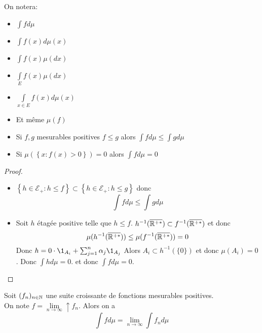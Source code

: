\begin{remarque}
	On notera:
	\begin{itemize}
		\item $\int f d\mu$
		\item $\int f(x) d\mu(x)$
		\item $\int f(x) \mu(dx)$
		\item $\int\limits_E f(x) \mu(dx)$
		\item $\int\limits_{x\in E} f(x) d\mu(x)$
		\item Et même $\mu(f)$
	\end{itemize}
\end{remarque}


\begin{prop}
	\begin{itemize}
		\item Si $f,g$ mesurables positives $f \leq g$ alors $\int f d\mu \leq \int g d\mu$
		\item Si $\mu(\left\{x : f(x) > 0\right\}) = 0$ alors $\int f d\mu = 0$
	\end{itemize}
\end{prop}

\begin{proof}
	\begin{itemize}
		\item $\left\{ h \in \mathcal{E}_+ : h \leq f \right\} \subset \left\{ h \in \mathcal{E}_+ : h \leq g \right\}$ donc
		      $$ \int f d\mu \leq \int g d\mu $$
		\item Soit $h$ étagée positive telle que $h \leq f$.
		      $h^{-1}(\overline{\mathbb{R}^{+*}}) \subset f^{-1}(\overline{\mathbb{R}^{+*}})$ et donc
		      $$ \mu(h^{-1}(\overline{\mathbb{R}^{+*}})) \leq \mu(f^{-1}(\overline{\mathbb{R}^{+*}})) = 0 $$
		      Donc $h = 0 \cdot \1_{A_i} + \sum_{j=1}^n \alpha_j \1_{A_j}$
		      Alors $A_i \subset h^{-1}(\{0\})$ et donc $\mu(A_i) = 0$.
		      Donc $\int h d\mu = 0$.
		      et donc $\int f d\mu = 0$.
	\end{itemize}
\end{proof}


\begin{theorem} \label{thm:convergence_monotone}
	Soit $(f_n)_{n \in \mathbb{N}}$ une suite croissante de fonctions mesurables positives.\\
	On note $f = \lim\limits_{n \to \infty}\uparrow f_n$.
	Alors on a
	$$ \int f d\mu = \lim\limits_{n \to \infty} \int f_n d\mu $$
\end{theorem}

